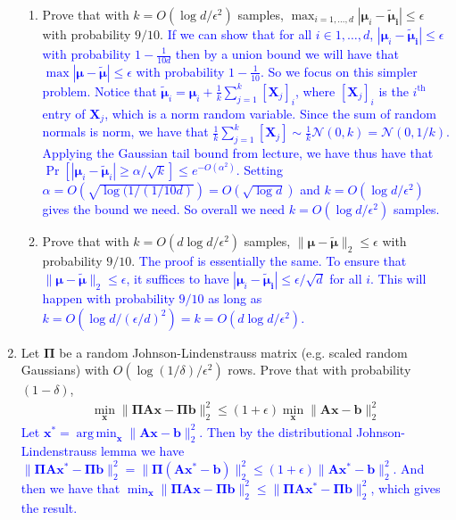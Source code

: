 \documentclass[10pt]{article}
\newcommand{\bs}[1]{\boldsymbol{#1}}
\newcommand{\bv}[1]{\mathbf{#1}}
\DeclareMathOperator*{\argmin}{arg\,min}
\begin{document}
\begin{enumerate}
	\begin{enumerate}
		\item Prove that with $k = O(\log d /\epsilon^2)$ samples, $\max_{i=1,\ldots, d}|\bs{\mu}_i -\bs{\tilde{\mu}_i} | \leq \epsilon$ with probability $9/10$.
		\textcolor{blue}{If we can show that for all $i\in 1, \ldots, d$, $|\bs{\mu}_i -\bs{\tilde{\mu}_i} | \leq \epsilon$ with probability $1 - \frac{1}{10d}$ then by a union bound we will have that $\max|\bs{\mu} -\bs{\tilde{\mu}}| \leq \epsilon$ with probability $1 - \frac{1}{10}$. So we focus on this simpler problem. Notice that $\bs{\tilde{\mu}}_i = \bs{{\mu}}_i + \frac{1}{k}\sum_{j=1}^k[\bv{X}_j]_i$, where $[\bv{X}_j]_i$ is the $i^\text{th}$ entry of $\bv{X}_j$, which is a norm random variable. Since the sum of random normals is norm, we have that $\frac{1}{k}\sum_{j=1}^k[\bv{X}_j] \sim \frac{1}{k}\mathcal{N}(0,k) = \mathcal{N}(0,1/k)$. Applying the Gaussian tail bound from lecture, we have thus have that $\Pr[|\bs{\mu}_i - \bs{\tilde{\mu}}_i| \geq \alpha/\sqrt{k}] \leq e^{-O(\alpha^2)}$. Setting $\alpha = O(\sqrt{\log(1/(1/10d)}) =  O(\sqrt{\log d})$ and $k = O({\log d}/\epsilon^2)$ gives the bound we need. So overall we need $k = O({\log d}/\epsilon^2)$ samples. }
		
		\item Prove that with $k = O(d\log d /\epsilon^2)$ samples, $\|\bs{\mu} -\bs{\tilde{\mu}}\|_2 \leq \epsilon$ with probability $9/10$.
		\textcolor{blue}{The proof is essentially the same. To ensure that $\|\bs{\mu} -\bs{\tilde{\mu}}\|_2 \leq \epsilon$, it suffices to have $|\bs{\mu}_i -\bs{\tilde{\mu}_i}| \leq \epsilon/\sqrt{d}$ for all $i$.  This will happen with probability $9/10$ as long as  $k = O({\log d}/({\epsilon/d})^2) = k = O(d {\log d}/{\epsilon}^2).$
		}
	\end{enumerate}

	\item Let $\bs{\Pi}$ be a random Johnson-Lindenstrauss matrix (e.g. scaled random Gaussians) with $O(\log(1/\delta)/\epsilon^2)$ rows. Prove that with probability $(1-\delta)$,
	\begin{align*}
	\min_{\bv{x}} \|\bs{\Pi}\bv{A}\bv{x} - \bs{\Pi}\bv{b}\|_2^2 \leq (1+\epsilon) \min_{\bv{x}} \|\bv{A}\bv{x} - \bv{b}\|_2^2 
	\end{align*}
\textcolor{blue}{Let $\bv{x}^* = \argmin_{\bv{x}} \|\bv{A}\bv{x} - \bv{b}\|_2^2.$ Then by the distributional Johnson-Lindenstrauss lemma we have $\|\bs{\Pi}\bv{A}\bv{x}^* - \bs{\Pi}\bv{b}\|_2^2 = \|\bs{\Pi}(\bv{A}\bv{x}^* - \bv{b})\|_2^2 \leq (1+\epsilon)\|\bv{A}\bv{x}^* - \bv{b}\|_2^2$. And then we have that $\min_{\bv{x}} \|\bs{\Pi}\bv{A}\bv{x} - \bs{\Pi}\bv{b}\|_2^2 \leq \|\bs{\Pi}\bv{A}\bv{x}^* - \bs{\Pi}\bv{b}\|_2^2$, which gives the result.}


\end{enumerate}
\end{document}
